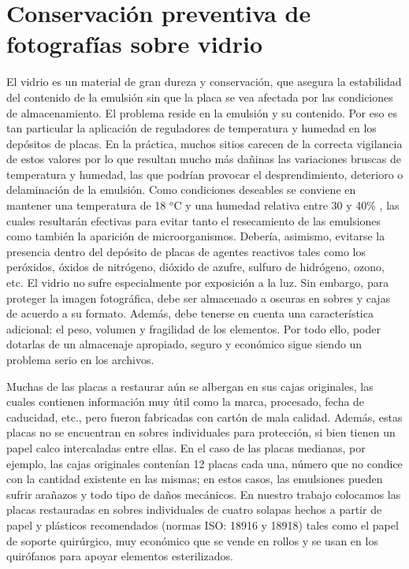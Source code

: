 \documentclass[baaa]{baaa}
\begin{document}
\section{Conservación preventiva de fotografías sobre vidrio}\label{conser}
El vidrio es un material de gran dureza y conservación, que asegura la estabilidad del contenido de la emulsión sin que la placa se vea afectada por las condiciones de almacenamiento.
El problema reside en la emulsión y su contenido. Por eso es tan particular la aplicación de reguladores de temperatura y humedad en los depósitos de placas.
En la práctica, muchos sitios carecen de la correcta vigilancia de estos valores por lo que resultan mucho más dañinas las variaciones bruscas de temperatura y humedad, las que podrían provocar el desprendimiento, deterioro o delaminación de la emulsión.
Como condiciones deseables se conviene en mantener una temperatura de 18 $^o$C y una humedad relativa entre 30 y 40\% \citep{Koob2006}, las cuales resultarán efectivas para evitar tanto el resecamiento de las emulsiones como también la aparición de microorganismos.
Debería, asimismo, evitarse la presencia dentro del depósito de placas de agentes reactivos tales como los peróxidos, óxidos de nitrógeno, dióxido de azufre, sulfuro de hidrógeno, ozono, etc.
El vidrio no sufre especialmente por exposición a la luz. Sin embargo, para proteger la imagen fotográfica, debe ser almacenado a oscuras en sobres y cajas de acuerdo a su formato.
Además, debe tenerse en cuenta una característica adicional: el peso, volumen y fragilidad de los elementos. Por todo ello, poder dotarlas de un almacenaje apropiado, seguro y económico sigue siendo un problema serio en los archivos. 

Muchas de las placas a restaurar aún se albergan en sus cajas originales, las cuales contienen información muy útil como la marca, procesado, fecha de caducidad, etc., pero fueron fabricadas con cartón de mala calidad.
Además, estas placas no se encuentran en sobres individuales para protección, si bien tienen un papel calco intercaladas entre ellas.
En el caso de las placas medianas, por ejemplo, las cajas originales contenían 12 placas cada una, número que no condice con la cantidad existente en las mismas; en estos casos, las emulsiones pueden sufrir arañazos y todo tipo de daños mecánicos.
En nuestro trabajo colocamos las placas restauradas en sobres individuales de cuatro solapas hechos a partir de papel y plásticos recomendados (normas ISO: 18916 y 18918)
tales como el papel de soporte quirúrgico, muy económico que se vende en rollos y se usan en los quirófanos para apoyar elementos esterilizados.
\end{document}
